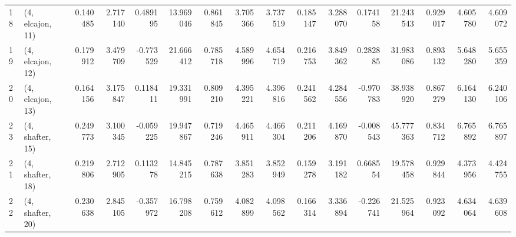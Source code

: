 \begin{tabular}{llrrrrrrrrrrrrrr}
18 &  (4, elcajon, 11) &   0.140485 &  2.717140 &  0.489195 &  13.969046 &  0.861845 &   3.705366 &  3.737519 &  0.185147 &  3.288070 &  0.174158 &   21.243543 &  0.929017 &   4.605780 &   4.609072 \\
19 &  (4, elcajon, 12) &   0.179912 &  3.479709 & -0.773529 &  21.666412 &  0.785718 &   4.589996 &  4.654719 &  0.216753 &  3.849362 &  0.282885 &   31.983086 &  0.893132 &   5.648280 &   5.655359 \\
20 &  (4, elcajon, 13) &   0.164156 &  3.175847 &  0.118411 &  19.331991 &  0.809210 &   4.395221 &  4.396816 &  0.241562 &  4.284556 & -0.970783 &   38.938920 &  0.867279 &   6.164130 &   6.240106 \\
23 &  (4, shafter, 15) &   0.249773 &  3.100345 & -0.059225 &  19.947867 &  0.719246 &   4.465911 &  4.466304 &  0.211206 &  4.169870 & -0.008543 &   45.777363 &  0.834712 &   6.765892 &   6.765897 \\
21 &  (4, shafter, 18) &   0.219806 &  2.712905 &  0.113278 &  14.845215 &  0.787638 &   3.851283 &  3.852949 &  0.159278 &  3.191182 &  0.668554 &   19.578458 &  0.929844 &   4.373956 &   4.424755 \\
22 &  (4, shafter, 20) &   0.230638 &  2.845105 & -0.357972 &  16.798208 &  0.759612 &   4.082899 &  4.098562 &  0.166314 &  3.336894 & -0.226741 &   21.525964 &  0.923092 &   4.634064 &   4.639608 \\
\bottomrule
\end{tabular}
